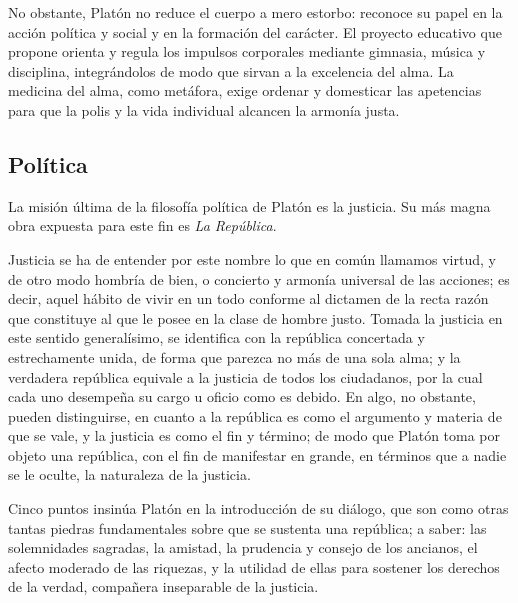 \documentclass[10pt]{article}
\begin{document}
No obstante, Platón no reduce el cuerpo a mero estorbo: reconoce su papel en la acción política y social y en la formación del carácter. El proyecto educativo que propone orienta y
regula los impulsos corporales mediante gimnasia, música y disciplina, integrándolos de modo que sirvan a la excelencia del alma. La medicina del alma, como metáfora, exige ordenar
y domesticar las apetencias para que la polis y la vida individual alcancen la armonía justa.

\subsection{Política}

La misión última de la filosofía política de Platón es la justicia. Su más magna obra expuesta para este fin es \textit{La República}.

Justicia se ha de entender por este nombre lo que en común llamamos virtud, y de otro modo hombría de bien, o concierto y armonía universal
de las acciones; es decir, aquel hábito de vivir en un todo conforme al dictamen de la recta razón que constituye al que le posee en la
clase de hombre justo. Tomada la justicia en este sentido generalísimo, se identifica con la república concertada y estrechamente unida, de
forma que parezca no más de una sola alma; y la verdadera república equivale a la justicia de todos los ciudadanos, por la cual cada uno
desempeña su cargo u oficio como es debido. En algo, no obstante, pueden distinguirse, en cuanto a la república es como el argumento y
materia de que se vale, y la justicia es como el fin y término; de modo que Platón toma por objeto una república, con el fin de manifestar
en grande, en términos que a nadie se le oculte, la naturaleza de la justicia.

Cinco puntos insinúa Platón en la introducción de su diálogo, que son como otras tantas piedras fundamentales sobre que se sustenta una
república; a saber: las solemnidades sagradas, la amistad, la prudencia y consejo de los ancianos, el afecto moderado de las riquezas, y
la utilidad de ellas para sostener los derechos de la verdad, compañera inseparable de la justicia.
\end{document}
